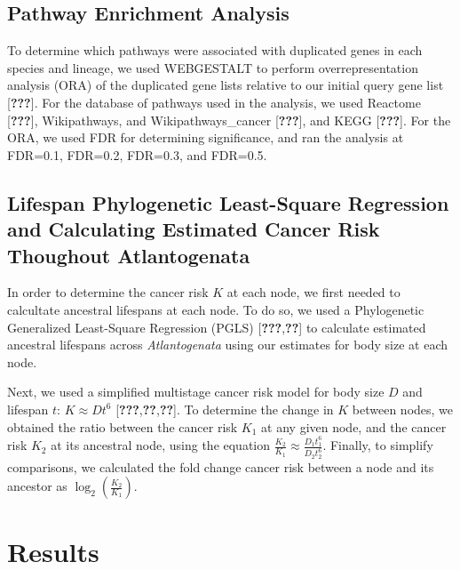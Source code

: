 \documentclass[10pt,letterpaper]{article}
\begin{document}
\hypertarget{pathway-enrichment-analysis}{%
\subsection{Pathway Enrichment
Analysis}\label{pathway-enrichment-analysis}}

To determine which pathways were associated with duplicated genes in
each species and lineage, we used WEBGESTALT to perform
overrepresentation analysis (ORA) of the duplicated gene lists relative
to our initial query gene list {[}{\textbf{???}}{]}. For the database of
pathways used in the analysis, we used Reactome {[}{\textbf{???}}{]},
Wikipathways, and Wikipathways\_cancer {[}{\textbf{???}}{]}, and KEGG
{[}{\textbf{???}}{]}. For the ORA, we used FDR for determining
significance, and ran the analysis at FDR=0.1, FDR=0.2, FDR=0.3, and
FDR=0.5.

\hypertarget{lifespan-phylogenetic-least-square-regression-and-calculating-estimated-cancer-risk-thoughout-atlantogenata}{%
\subsection{Lifespan Phylogenetic Least-Square Regression and
Calculating Estimated Cancer Risk Thoughout
Atlantogenata}\label{lifespan-phylogenetic-least-square-regression-and-calculating-estimated-cancer-risk-thoughout-atlantogenata}}

In order to determine the cancer risk \(K\) at each node, we first
needed to calcultate ancestral lifespans at each node. To do so, we used
a Phylogenetic Generalized Least-Square Regression (PGLS)
{[}{\textbf{???}},{\textbf{??}}{]} to calculate estimated ancestral
lifespans across \emph{Atlantogenata} using our estimates for body size
at each node.

Next, we used a simplified multistage cancer risk model for body size
\(D\) and lifespan \(t\): \(K \approx Dt^6\)
{[}{\textbf{???}},{\textbf{??}},{\textbf{??}}{]}. To determine the
change in \(K\) between nodes, we obtained the ratio between the cancer
risk \(K_{1}\) at any given node, and the cancer risk \(K_{2}\) at its
ancestral node, using the equation
\(\frac{K_{2}}{K_{1}} \approx \frac{D_{1}t_{1}^6}{D_{2}t_{2}^6}\).
Finally, to simplify comparisons, we calculated the fold change cancer
risk between a node and its ancestor as
\(\log_{2}(\frac{K_{2}}{K_{1}})\).

\hypertarget{results}{%
\section{Results}\label{results}}
\end{document}
